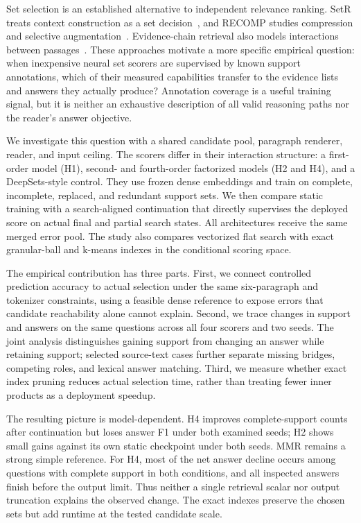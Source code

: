 \documentclass[preprint,12pt]{elsarticle}
\begin{document}
Set selection is an established alternative to independent relevance ranking. SetR treats context construction as a set decision~\cite{lee2025setr}, and RECOMP studies compression and selective augmentation~\cite{xu2024recomp}. Evidence-chain retrieval also models interactions between passages~\cite{zhang2024beam,guo2025interchunk}. These approaches motivate a more specific empirical question: when inexpensive neural set scorers are supervised by known support annotations, which of their measured capabilities transfer to the evidence lists and answers they actually produce? Annotation coverage is a useful training signal, but it is neither an exhaustive description of all valid reasoning paths nor the reader's answer objective.

We investigate this question with a shared candidate pool, paragraph renderer, reader, and input ceiling. The scorers differ in their interaction structure: a first-order model (H1), second- and fourth-order factorized models (H2 and H4), and a DeepSets-style control. They use frozen dense embeddings and train on complete, incomplete, replaced, and redundant support sets. We then compare static training with a search-aligned continuation that directly supervises the deployed score on actual final and partial search states. All architectures receive the same merged error pool. The study also compares vectorized flat search with exact granular-ball and k-means indexes in the conditional scoring space.

The empirical contribution has three parts. First, we connect controlled prediction accuracy to actual selection under the same six-paragraph and tokenizer constraints, using a feasible dense reference to expose errors that candidate reachability alone cannot explain. Second, we trace changes in support and answers on the same questions across all four scorers and two seeds. The joint analysis distinguishes gaining support from changing an answer while retaining support; selected source-text cases further separate missing bridges, competing roles, and lexical answer matching. Third, we measure whether exact index pruning reduces actual selection time, rather than treating fewer inner products as a deployment speedup.

The resulting picture is model-dependent. H4 improves complete-support counts after continuation but loses answer F1 under both examined seeds; H2 shows small gains against its own static checkpoint under both seeds. MMR remains a strong simple reference. For H4, most of the net answer decline occurs among questions with complete support in both conditions, and all inspected answers finish before the output limit. Thus neither a single retrieval scalar nor output truncation explains the observed change. The exact indexes preserve the chosen sets but add runtime at the tested candidate scale.
\end{document}
